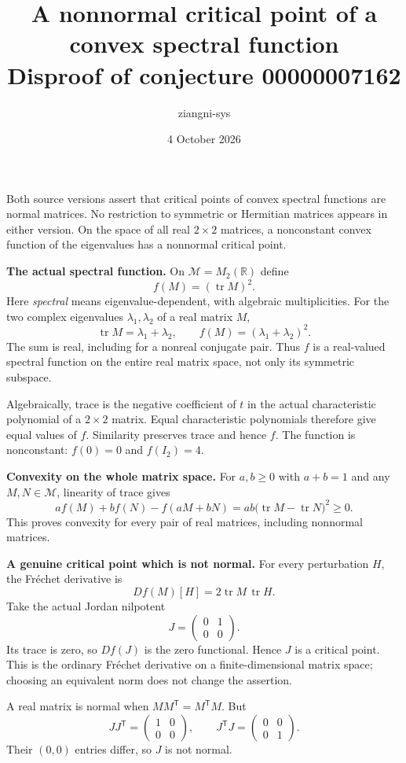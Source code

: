 \documentclass[11pt]{article}
\title{A nonnormal critical point of a convex spectral function\\
\large Disproof of conjecture 00000007162}
\author{ziangni-sys}
\date{4 October 2026}
\begin{document}
\maketitle
Both source versions assert that critical points of convex spectral
functions are normal matrices. No restriction to symmetric or
Hermitian matrices appears in either version.
On the space of all real $2\times2$ matrices, a nonconstant convex
function of the eigenvalues has a nonnormal critical point.

\textbf{The actual spectral function.}
On $\mathcal M=M_2(\mathbb R)$ define
\[
 f(M)=(\operatorname{tr}M)^2.
\]
Here \emph{spectral} means eigenvalue-dependent, with algebraic
multiplicities. For the two complex eigenvalues $\lambda_1,\lambda_2$
of a real matrix $M$,
\[
 \operatorname{tr}M=\lambda_1+\lambda_2,\qquad
 f(M)=(\lambda_1+\lambda_2)^2.
\]
The sum is real, including for a nonreal conjugate pair.
Thus $f$ is a real-valued spectral function on the entire real
matrix space, not only its symmetric subspace.

Algebraically, trace is the negative coefficient of $t$ in the
actual characteristic polynomial of a $2\times2$ matrix.
Equal characteristic polynomials therefore give equal values of $f$.
Similarity preserves trace and hence $f$.
The function is nonconstant: $f(0)=0$ and $f(I_2)=4$.

\textbf{Convexity on the whole matrix space.}
For $a,b\geq0$ with $a+b=1$ and any $M,N\in\mathcal M$, linearity
of trace gives
\[
 af(M)+bf(N)-f(aM+bN)
 =ab\bigl(\operatorname{tr}M-\operatorname{tr}N\bigr)^2\geq0.
\]
This proves convexity for every pair of real matrices, including
nonnormal matrices.

\newpage
\textbf{A genuine critical point which is not normal.}
For every perturbation $H$, the Fr\'echet derivative is
\[
 Df(M)[H]=2\operatorname{tr}M\,\operatorname{tr}H.
\]
Take the actual Jordan nilpotent
\[
 J=\begin{pmatrix}0&1\\0&0\end{pmatrix}.
\]
Its trace is zero, so $Df(J)$ is the zero functional.
Hence $J$ is a critical point. This is the ordinary Fr\'echet
derivative on a finite-dimensional matrix space; choosing an
equivalent norm does not change the assertion.

A real matrix is normal when $MM^{\mathsf T}=M^{\mathsf T}M$.
But
\[
 JJ^{\mathsf T}=\begin{pmatrix}1&0\\0&0\end{pmatrix},
 \qquad
 J^{\mathsf T}J=\begin{pmatrix}0&0\\0&1\end{pmatrix}.
\]
Their $(0,0)$ entries differ, so $J$ is not normal.
\end{document}
